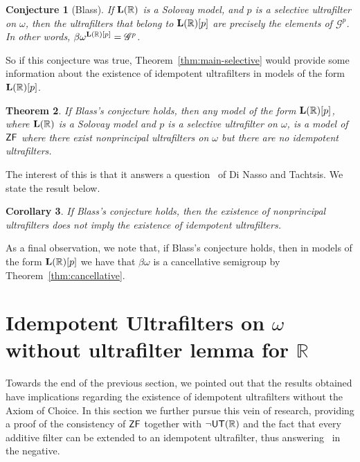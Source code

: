 \documentclass[10pt]{amsart}
\newcommand{\lr}{\mathnormal{\mathbf{L}(\mathbb R)}}
\newcommand{\zf}{\mathnormal{\mathsf{ZF}}}
\newcommand{\utr}{\mathnormal{\mathsf{UT}(\mathbb R)}}
\newtheorem{theorem}{Theorem}[section]
\newtheorem{corollary}[theorem]{Corollary}
\newtheorem{conjecture}[theorem]{Conjecture}
\theoremstyle{definition}
\theoremstyle{remark}
\begin{document}
\begin{conjecture}[Blass]
If $\lr$ is a Solovay model, and $p$ is a selective ultrafilter on $\omega$, then the ultrafilters that belong to $\lr[p]$ are precisely the elements of $\mathscr G^p$. In other words, $\beta\omega^{\lr[p]}=\mathscr G^p$.
\end{conjecture}

So if this conjecture was true, Theorem~\ref{thm:main-selective} would provide some information about the existence of idempotent ultrafilters in models of the form $\lr[p]$.

\begin{theorem}
    If Blass's conjecture holds, then any model of the form $\lr[p]$, where $\lr$ is a Solovay model and $p$ is a selective ultrafilter on $\omega$, is a model of $\zf$ where there exist nonprincipal ultrafilters on $\omega$ but there are no idempotent ultrafilters.
\end{theorem}

The interest of this is that it answers a question~\cite[(5), p. 410]{dinasso-tachtsis} of Di Nasso and Tachtsis. We state the result below.

\begin{corollary}
    If Blass's conjecture holds, then the existence of nonprincipal ultrafilters does not imply the existence of idempotent ultrafilters.
\end{corollary}

As a final observation, we note that, if Blass's conjecture holds, then in models of the form $\lr[p]$ we have that $\beta\omega$ is a cancellative semigroup by Theorem~\ref{thm:cancellative}.

\section{Idempotent Ultrafilters on $\omega$ without ultrafilter lemma for $\mathbb{R}$}

Towards the end of the previous section, we pointed out that the results obtained have implications regarding the existence of idempotent ultrafilters without the Axiom of Choice. In this section we further pursue this vein of research, providing a proof of the consistency of $\zf$ together with $\neg\utr$ and the fact that every additive filter can be extended to an idempotent ultrafilter, thus answering~\cite[Question (2), p. 410]{dinasso-tachtsis} in the negative.
\end{document}
